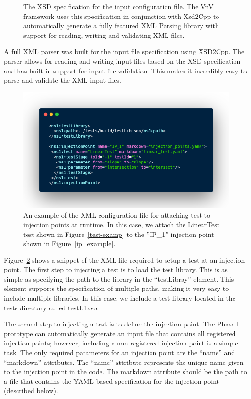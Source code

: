 \begin{figure}
\caption{The XSD specification for the input configuration file. The VnV framework uses this specification in conjunction with Xsd2Cpp to automatically generate
a fully featured XML Parsing library with support for reading, writing and validating XML files. \label{fig:xsd_specification}}
 \end{figure}

A full XML parser was built for the input file specification using XSD2Cpp. The parser allows for reading and writing input files based on the XSD specification and has built 
in support for input file validation. This makes it incredibly easy to parse and validate the XML input files. 

\begin{figure}
 \includegraphics[width=\textwidth]{./Figures/test-xml1.png}
 \caption{An example of the XML configuration file for attaching test to injection points at runtime. In this case, we attach the LinearTest test shown in Figure~\ref{test-examp} to the ''IP\_1''
 injection point shown in Figure~\ref{ip_example}. \label{test-xml}}
\end{figure}

Figure~\ref{test-xml} shows a snippet of the XML file required to setup a test at an injection point. The first step to injecting a test
is to load the test library. This is as simple as specifying the path to the library in the ``testLibray'' element. This element supports
the specification of multiple paths, making it very easy to include multiple libraries. In this case, we include a test library located in
the tests directory called testLib.so.

The second step to injecting a test is to define the injection point. The Phase I prototype can automatically generate
an input file that contains all registered injection points; however, including a non-registered injection point is a simple 
task. The only required parameters for an injection point are the ``name'' and ``markdown'' attributes. The ``name'' attribute
represents the unique name given to the injection point in the code. The markdown attribute should be the path to a file that 
contains the YAML based specification for the injection point (described below).

